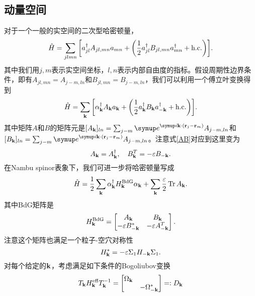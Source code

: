 \subsection{动量空间}
对于一个一般的实空间的二次型哈密顿量，
\begin{equation}
  \hat H=\sum_{jlmn}\bqty{a_{jl}^\dagger A_{jl,mn} a_{mn}+ \pqty{\frac{1}{2}a_{jl}^\dagger B_{jl,mn} a^\dagger_{mn} + \hc} }.
\end{equation}
其中我们用$j,m$表示实空间坐标，$l,n$表示内部自由度的指标。假设周期性边界条件，即有$A_{jl,mn}=A_{j-m,ln}$和$B_{jl,mn}=B_{j-m,ln}$，我们可以利用一个傅立叶变换得到
\begin{equation}
  \hat H= \sum_{\vb k} \bqty{\alpha^\dagger_{\vb k} A_{\vb k} a_{\vb k} +\pqty{\frac{1}{2}a_{\vb k}^\dagger B_{\vb k} a_{-\vb k}^\dagger +\hc}}.
\end{equation}
其中矩阵$A$和$B$的矩阵元是$[A_{\vb k}]_{ln}= \sum_{j-m} \eu^{\iu \vb k\cdot (\vb r_j-\vb r_m)} A_{j-m,ln} $和$[B_{\vb k}]_{ln}=\sum_{j-m} \eu^{\iu \vb k\cdot (\vb r_j-\vb r_m)} A_{j-m,ln} $。注意式\eqref{AB}对应到这里变为
\begin{equation}
  A_{\vb k}=A^\dagger_{\vb k},\quad B_{\vb k}^T = -\varepsilon B_{-\vb k}.
\end{equation}
在Nambu spinor表象下，我们可进一步将哈密顿量写成
\begin{equation}
  \hat H = \frac{1}{2}\sum_{\vb k} \alpha_{\vb k}^\dagger H_{\vb k}^{{\text{BdG}}} \alpha_{\vb k} + \sum_{\vb k}\frac{\varepsilon}{2}\Tr A_{\vb k}.\label{hbdgk}
\end{equation}
其中BdG矩阵是
\begin{equation}
  H_{\vb k}^{\text{BdG}} = \begin{bmatrix}
      A_{\vb k} & B_{\vb k}\\
      -\varepsilon B_{-\vb k}^* & -\varepsilon A^T_{-\vb k}
  \end{bmatrix}.\label{hkbdg}
\end{equation}
注意这个矩阵也满足一个粒子-空穴对称性
\begin{equation}
  H_{\vb k}^* =- \varepsilon\Sigma_1 H_{-\vb k} \Sigma_1.\label{phshk}
\end{equation}
对每个给定的$\vb k$，考虑满足如下条件的Bogoliubov变换
\begin{equation}
  T_{\vb k}H^{\text{eff}}_{\vb k} T^{-1}_{\vb k} = \begin{bmatrix}
      \Omega_{\vb k} & \\
      & -\Omega_{-\vb k}^* 
  \end{bmatrix}=: D_{\vb k}\label{deftk}
\end{equation}
